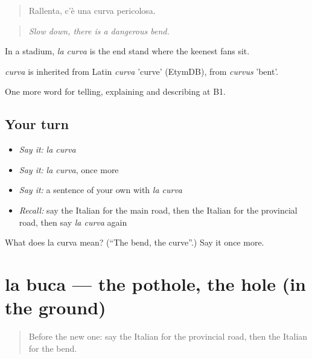 \begin{quote}
Rallenta, c'è una curva pericolosa.
\end{quote}

\begin{quote}
\emph{Slow down, there is a dangerous bend.}
\end{quote}

In a stadium, \emph{la curva} is the end stand where the keenest fans sit.

\begin{cousinweb}
\emph{curva} is inherited from Latin \emph{curva} 'curve' (EtymDB), from \emph{curvus} 'bent'.
\end{cousinweb}

\begin{grammarlens}[title={What you've built}]
One more word for telling, explaining and describing at B1.
\end{grammarlens}

\subsection*{Your turn}
\begin{itemize}
\raggedright
  \item \emph{Say it:} \emph{la curva}
  \item \emph{Say it:} \emph{la curva}, once more
  \item \emph{Say it:} a sentence of your own with \emph{la curva}
  \item \emph{Recall:} say the Italian for the main road, then the Italian for the provincial road, then say \emph{la curva} again
\end{itemize}

\begin{tcolorbox}[breakable,colback=teal!4,colframe=teal!35!black,title={Before you move on}]
What does la curva mean? (\textquotedblleft{}The bend, the curve\textquotedblright{}.) Say it once more.
\end{tcolorbox}
\section[la buca]{la buca — the pothole, the hole (in the ground)}

\label{lesson:IT-C414-buca}



\begin{quote}
Before the new one: say the Italian for the provincial road, then the Italian for the bend.
\end{quote}

